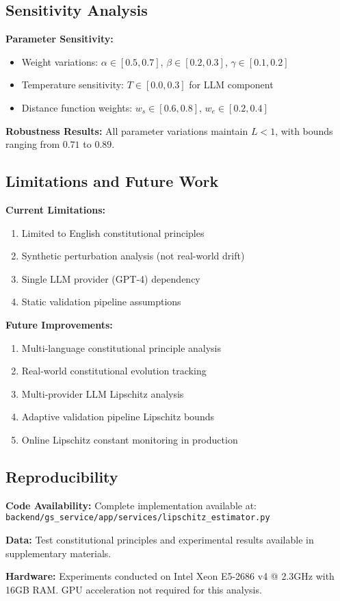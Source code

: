 \subsection{Sensitivity Analysis}

\textbf{Parameter Sensitivity:}
\begin{itemize}
    \item Weight variations: $\alpha \in [0.5, 0.7]$, $\beta \in [0.2, 0.3]$, $\gamma \in [0.1, 0.2]$
    \item Temperature sensitivity: $T \in [0.0, 0.3]$ for LLM component
    \item Distance function weights: $w_s \in [0.6, 0.8]$, $w_e \in [0.2, 0.4]$
\end{itemize}

\textbf{Robustness Results:}
All parameter variations maintain $L < 1$, with bounds ranging from $0.71$ to $0.89$.

\subsection{Limitations and Future Work}

\textbf{Current Limitations:}
\begin{enumerate}
    \item Limited to English constitutional principles
    \item Synthetic perturbation analysis (not real-world drift)
    \item Single LLM provider (GPT-4) dependency
    \item Static validation pipeline assumptions
\end{enumerate}

\textbf{Future Improvements:}
\begin{enumerate}
    \item Multi-language constitutional principle analysis
    \item Real-world constitutional evolution tracking
    \item Multi-provider LLM Lipschitz analysis
    \item Adaptive validation pipeline Lipschitz bounds
    \item Online Lipschitz constant monitoring in production
\end{enumerate}

\subsection{Reproducibility}

\textbf{Code Availability:}
Complete implementation available at: \texttt{backend/gs\_service/app/services/lipschitz\_estimator.py}

\textbf{Data:}
Test constitutional principles and experimental results available in supplementary materials.

\textbf{Hardware:}
Experiments conducted on Intel Xeon E5-2686 v4 @ 2.3GHz with 16GB RAM. GPU acceleration not required for this analysis.
